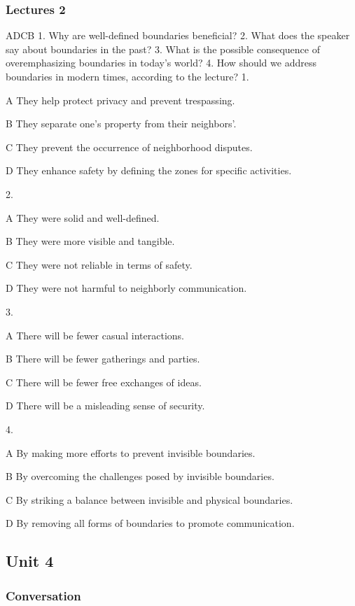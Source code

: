 \subsubsection{Lectures 2}

\begin{enumerate}
	ADCB
	1. Why are well-defined boundaries beneficial?
	2. What does the speaker say about boundaries in the past?
	3. What is the possible consequence of overemphasizing boundaries in today’s world?
	4. How should we address boundaries in modern times, according to the lecture?
	1.
	
	A
	They help protect privacy and prevent trespassing.
	
	B
	They separate one's property from their neighbors'.
	
	C
	They prevent the occurrence of neighborhood disputes.
	
	D
	They enhance safety by defining the zones for specific activities.
	
	2.
	
	A
	They were solid and well-defined.
	
	B
	They were more visible and tangible.
	
	C
	They were not reliable in terms of safety.
	
	D
	They were not harmful to neighborly communication.
	
	3.
	
	A
	There will be fewer casual interactions.
	
	B
	There will be fewer gatherings and parties.
	
	C
	There will be fewer free exchanges of ideas.
	
	D
	There will be a misleading sense of security.
	
	4.
	
	A
	By making more efforts to prevent invisible boundaries.
	
	B
	By overcoming the challenges posed by invisible boundaries.
	
	C
	By striking a balance between invisible and physical boundaries.
	
	D
	By removing all forms of boundaries to promote communication.
\end{enumerate}

\newpage
\subsection{Unit 4}

\subsubsection{Conversation}

